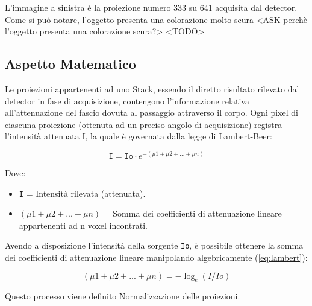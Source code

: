 \documentclass[a4paper,12pt, doubleside]{report}
\begin{document}
                L'immagine a sinistra è la proiezione numero 333 su 641 acquisita dal detector. Come si può notare, l'oggetto presenta una colorazione molto scura
                <ASK perchè l'oggetto presenta una colorazione scura?> <TODO>
                
            
            \subsection{Aspetto Matematico}
                \label{sub:norm-math}
                \par
                    Le proiezioni appartenenti ad uno Stack, essendo il diretto risultato rilevato dal detector in fase di acquisizione, contengono l'informazione relativa all'attenuazione del fascio dovuta al passaggio attraverso il corpo. Ogni pixel di ciascuna proiezione (ottenuta ad un preciso angolo di acquisizione) registra l'intensità attenuata I, la quale è governata dalla legge di Lambert-Beer\cite{lambert-beer}:

                    \begin{equation} \label{eq:lambert}
                        \texttt{I} = \texttt{Io} \cdot e^{- (\mu1 + \mu2 + ...  + \mu n)}
                    \end{equation}
                    
                    Dove:
                    \begin{itemize}
                      \item \texttt{I} = Intensità rilevata (attenuata).
                      \item \texttt{$ (\mu1 + \mu2 + ... + \mu n) $} = Somma dei coefficienti di attenuazione lineare appartenenti ad n voxel incontrati.
                    \end{itemize}
                    
                \par
                    Avendo a disposizione l'intensità della sorgente \texttt{Io}, è possibile ottenere la somma dei coefficienti di attenuazione lineare manipolando algebricamente (\ref{eq:lambert}):
                    
                    \begin{equation} \label{eq:normalization}
                        (\mu1 + \mu2 + ... + \mu n) = - \log_e{(I/Io)}
                    \end{equation}
                    
                    Questo processo viene definito Normalizzazione delle proiezioni.
                
\end{document}
